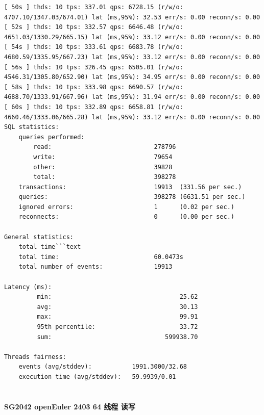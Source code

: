 \documentclass{article}
\begin{document}
\begin{verbatim}
[ 50s ] thds: 10 tps: 337.01 qps: 6728.15 (r/w/o: 4707.10/1347.03/674.01) lat (ms,95%): 32.53 err/s: 0.00 reconn/s: 0.00
[ 52s ] thds: 10 tps: 332.57 qps: 6646.48 (r/w/o: 4651.03/1330.29/665.15) lat (ms,95%): 33.12 err/s: 0.00 reconn/s: 0.00
[ 54s ] thds: 10 tps: 333.61 qps: 6683.78 (r/w/o: 4680.59/1335.95/667.23) lat (ms,95%): 33.12 err/s: 0.00 reconn/s: 0.00
[ 56s ] thds: 10 tps: 326.45 qps: 6505.01 (r/w/o: 4546.31/1305.80/652.90) lat (ms,95%): 34.95 err/s: 0.00 reconn/s: 0.00
[ 58s ] thds: 10 tps: 333.98 qps: 6690.57 (r/w/o: 4688.70/1333.91/667.96) lat (ms,95%): 31.94 err/s: 0.00 reconn/s: 0.00
[ 60s ] thds: 10 tps: 332.89 qps: 6658.81 (r/w/o: 4660.46/1333.06/665.28) lat (ms,95%): 33.12 err/s: 0.00 reconn/s: 0.00
SQL statistics:
    queries performed:
        read:                            278796
        write:                           79654
        other:                           39828
        total:                           398278
    transactions:                        19913  (331.56 per sec.)
    queries:                             398278 (6631.51 per sec.)
    ignored errors:                      1      (0.02 per sec.)
    reconnects:                          0      (0.00 per sec.)

General statistics:
    total time```text
    total time:                          60.0473s
    total number of events:              19913

Latency (ms):
         min:                                   25.62
         avg:                                   30.13
         max:                                   99.91
         95th percentile:                       33.72
         sum:                               599938.70

Threads fairness:
    events (avg/stddev):           1991.3000/32.68
    execution time (avg/stddev):   59.9939/0.01
    
\end{verbatim}

\paragraph{SG2042 openEuler 2403 64 线程 读写}
\end{document}
